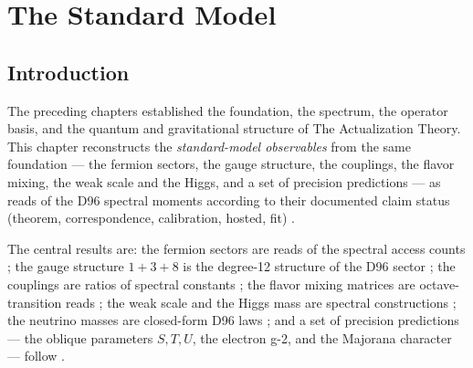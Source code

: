 %
%


\chapter{The Standard Model}
\label{c11:chap:sm}

\section{Introduction}
\label{c11:sec:sm-introduction}

The preceding chapters established the foundation, the spectrum, the operator basis, and
the quantum and gravitational structure of The Actualization Theory. This chapter
reconstructs the \emph{standard-model observables} from the same foundation --- the fermion
sectors, the gauge structure, the couplings, the flavor mixing, the weak scale and the
Higgs, and a set of precision predictions --- as reads of the D96 spectral moments
according to their documented claim status (theorem, correspondence, calibration, hosted,
fit) \cite{c11:QG149,c11:QG150,c11:QG157}.

The central results are: the fermion sectors are reads of the spectral access counts
\cite{c11:QG149,c11:QG150}; the gauge structure $1+3+8$ is the degree-12 structure of the D96
sector \cite{c11:QG161}; the couplings are ratios of spectral constants \cite{c11:QG162}; the
flavor mixing matrices are octave-transition reads \cite{c11:QG165,c11:QG167}; the weak scale and
the Higgs mass are spectral constructions \cite{c11:QG168,c11:QG169}; the neutrino masses are
closed-form D96 laws \cite{c11:QG172}; and a set of precision predictions --- the oblique
parameters $S,T,U$, the electron g-2, and the Majorana character --- follow
\cite{c11:QG176,c11:QG178,c11:QG179,c11:QG180}.

